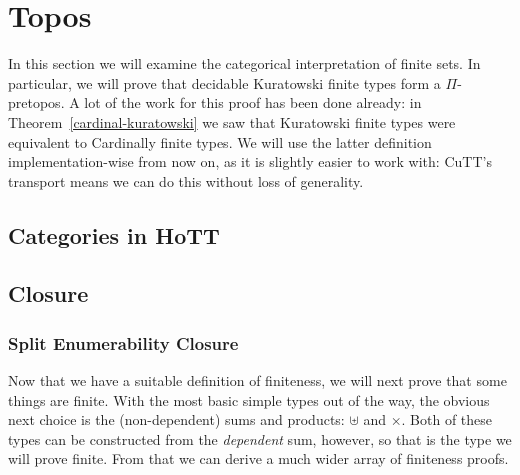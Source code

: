 \chapter{Topos} \label{topos}
In this section we will examine the categorical interpretation of finite sets.
In particular, we will prove that decidable Kuratowski finite types form a
\(\Pi\)-pretopos.
A lot of the work for this proof has been done already: in
Theorem~\ref{cardinal-kuratowski} we saw that Kuratowski finite types were
equivalent to Cardinally finite types.
We will use the latter definition implementation-wise from now on, as it is
slightly easier to work with: CuTT's transport means we can do this without loss
of generality.

\section{Categories in HoTT}
\section{Closure}
\subsection{Split Enumerability Closure}
Now that we have a suitable definition of finiteness, we will next prove that
some things are finite.
With the most basic simple types out of the way, the obvious next choice is the
(non-dependent) sums and products: \(\uplus\) and \(\times\).
Both of these types can be constructed from the \emph{dependent} sum, however,
so that is the type we will prove finite.
From that we can derive a much wider array of finiteness proofs.

